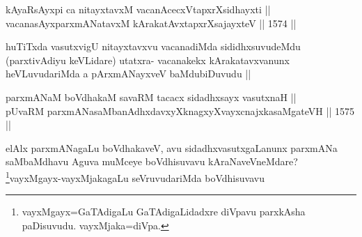 
\begin{shl}
kAyaRsAyxpi ca nitayxtavxM vacanAcecxVtapxrXsidhayxti ||  \\
vacanasAyxparxmANatavxM kArakatAvxtapxrXsajayxteV ||  1574 ||  
\end{shl}

\begin{artha}
huTiTxda vasutxvigU nitayxtavxvu vacanadiMda sididhxsuvudeMdu (parxtivAdiyu keVLidare) utatxra- vacanakekx kArakatavxvanunx heVLuvudariMda a pArxmANayxveV baMdubiDuvudu ||
\end{artha}

\begin{shl}
parxmANaM boVdhakaM savaRM tacacx sidadhxsayx vasutxnaH || \\
pUvaRM parxmANasaMbanAdhxdavxyXknagxyXvayxcnajxkasaMgateVH ||  1575 ||  
\end{shl}

\begin{artha}
elAlx parxmANagaLu boVdhakaveV, avu sidadhxvasutxgaLanunx parxmANa saMbaMdhavu Aguva muMceye boVdhisuvavu kAraNaveVneMdare? \footnote{vayxMgayx=GaTAdigaLu GaTAdigaLidadxre diVpavu parxkAsha paDisuvudu. vayxMjaka=diVpa.}vayxMgayx-vayxMjakagaLu seVruvudariMda boVdhisuvavu
\end{artha} 
